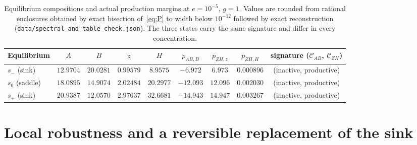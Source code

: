 \documentclass[11pt,a4paper]{article}
\theoremstyle{plain}
\theoremstyle{definition}
\theoremstyle{remark}
\newcommand{\cAB}{\mathcal{C}_{AB}}
\newcommand{\cZH}{\mathcal{C}_{ZH}}
\begin{document}
\begin{table}[tb]\centering\footnotesize\setlength{\tabcolsep}{4.5pt}
\begin{tabular}{@{}lcccccccc@{}}\toprule
Equilibrium & $A$ & $B$ & $z$ & $H$ & $p_{AB,B}$ & $p_{ZH,z}$ & $p_{ZH,H}$ & signature ($\cAB$, $\cZH$)\\\midrule
$s_-$ (sink) & $12.9704$ & $20.0281$ & $0.99579$ & $8.9575$ & $-6.972$ & $6.973$ & $0.000896$ & (inactive, productive)\\
$s_0$ (saddle) & $18.0895$ & $14.9074$ & $2.02484$ & $20.2977$ & $-12.093$ & $12.096$ & $0.002030$ & (inactive, productive)\\
$s_+$ (sink) & $20.9387$ & $12.0570$ & $2.97637$ & $32.6681$ & $-14.943$ & $14.947$ & $0.003267$ & (inactive, productive)\\\bottomrule
\end{tabular}
\caption{Equilibrium compositions and actual production margins at $e=10^{-5}$, $g=1$. Values are rounded from rational enclosures obtained by exact bisection of~\eqref{eq:P} to width below $10^{-12}$ followed by exact reconstruction (\texttt{data/spectral\_and\_table\_check.json}). The three states carry the same signature and differ in every concentration.}\label{tab:compositions}
\end{table}

\section{Local robustness and a reversible replacement of the sink}\label{sec:persistence}
\end{document}
